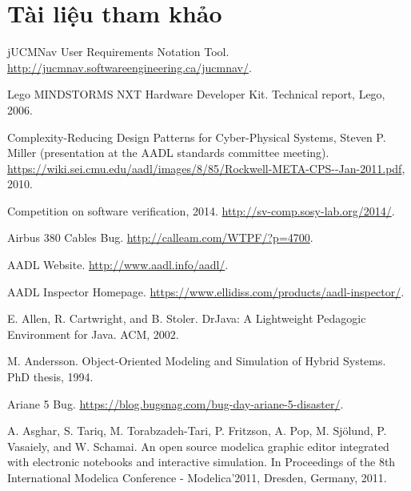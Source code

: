 \chapter*{Tài liệu tham khảo}



\begin{description}[style=nextline,leftmargin=12mm,labelwidth=10mm,font=\normalfont]

\item[{[1]}] jUCMNav User Requirements Notation Tool. \url{http://jucmnav.softwareengineering.ca/jucmnav/}.

\item[{[2]}] Lego MINDSTORMS NXT Hardware Developer Kit. Technical report, Lego, 2006.

\item[{[3]}] Complexity-Reducing Design Patterns for Cyber-Physical Systems, Steven P. Miller (presentation at the AADL standards committee meeting). \url{https://wiki.sei.cmu.edu/aadl/images/8/85/Rockwell-META-CPS--Jan-2011.pdf}, 2010.

\item[{[4]}] Competition on software verification, 2014. \url{http://sv-comp.sosy-lab.org/2014/}.

\item[{[5]}] Airbus 380 Cables Bug. \url{http://calleam.com/WTPF/?p=4700}.

\item[{[6]}] AADL Website. \url{http://www.aadl.info/aadl/}.

\item[{[7]}] AADL Inspector Homepage. \url{https://www.ellidiss.com/products/aadl-inspector/}.

\item[{[8]}] E. Allen, R. Cartwright, and B. Stoler. DrJava: A Lightweight Pedagogic Environment for Java. ACM, 2002.

\item[{[9]}] M. Andersson. Object-Oriented Modeling and Simulation of Hybrid Systems. PhD thesis, 1994.

\item[{[10]}] Ariane 5 Bug. \url{https://blog.bugsnag.com/bug-day-ariane-5-disaster/}.

\item[{[11]}] A. Asghar, S. Tariq, M. Torabzadeh-Tari, P. Fritzson, A. Pop, M. Sjölund, P. Vasaiely, and W. Schamai. An open source modelica graphic editor integrated with electronic notebooks and interactive simulation. In Proceedings of the 8th International Modelica Conference - Modelica’2011, Dresden, Germany, 2011.


\end{description}
